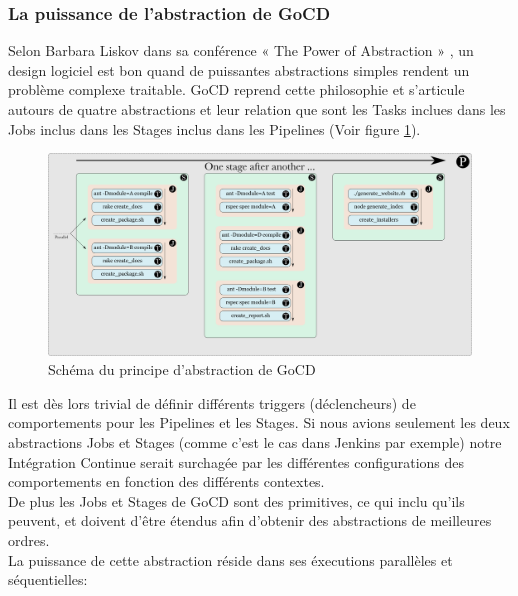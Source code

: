     \subsubsection{La puissance de l'abstraction de GoCD}
    Selon Barbara Liskov dans sa conférence « The Power of Abstraction » \cite{Lis09}, un design logiciel est bon quand de puissantes abstractions simples rendent un problème complexe traitable. GoCD reprend cette philosophie et s'articule autours de quatre abstractions et leur relation que sont les Tasks inclues dans les Jobs inclus dans les Stages inclus dans les Pipelines (Voir figure \ref{Pipeline}).\\

    \begin{figure}
      \begin{center}
        \includegraphics[scale=0.7]{images/pipeline.png}
      \end{center}
      \caption{Schéma du principe d'abstraction de GoCD}
      \label{Pipeline}
    \end{figure}

    Il est dès lors trivial de définir différents triggers (déclencheurs) de comportements pour les Pipelines et les Stages. Si nous avions seulement les deux abstractions Jobs et Stages (comme c'est le cas dans Jenkins par exemple) notre Intégration Continue serait surchagée par les différentes configurations des comportements en fonction des différents contextes.\\

    De plus les Jobs et Stages de GoCD sont des primitives, ce qui inclu qu'ils peuvent, et doivent d'être étendus afin d'obtenir des abstractions de meilleures ordres.\\

    La puissance de cette abstraction réside dans ses éxecutions parallèles et séquentielles:\\

